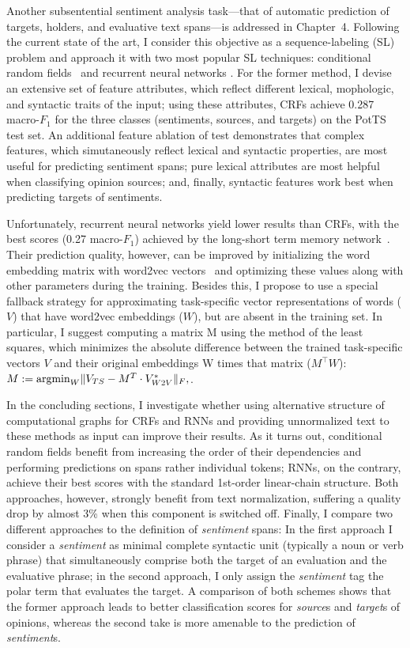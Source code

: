 \documentclass[11pt]{article}
\newcommand{\F}[0]{$F_1$}
\newcommand{\argmin}{\operatornamewithlimits{argmin}}
\renewcommand{\cite}{\citep}
\begin{document}
Another subsentential sentiment analysis task---that of automatic
prediction of targets, holders, and evaluative text spans---is
addressed in Chapter~4.  Following the current state of the art, I
consider this objective as a sequence-labeling (SL) problem and
approach it with two most popular SL techniques: conditional random
fields~\cite[CRFs; ][]{Lafferty:01} and recurrent neural networks
\cite[RNNs; ][]{Hochreiter:97,Cho:14a}.  For the former method, I
devise an extensive set of feature attributes, which reflect different
lexical, mophologic, and syntactic traits of the input; using these
attributes, CRFs achieve 0.287 macro-\F{} for the three classes
(sentiments, sources, and targets) on the PotTS test set.  An
additional feature ablation of test demonstrates that complex
features, which simutaneously reflect lexical and syntactic
properties, are most useful for predicting sentiment spans; pure
lexical attributes are most helpful when classifying opinion sources;
and, finally, syntactic features work best when predicting targets of
sentiments.

Unfortunately, recurrent neural networks yield lower results than
CRFs, with the best scores (0.27 macro-\F{}) achieved by the
long-short term memory network~\cite{Hochreiter:97}.  Their prediction
quality, however, can be improved by initializing the word embedding
matrix with word2vec vectors~\cite{Mikolov:13} and optimizing these
values along with other parameters during the training.  Besides this,
I propose to use a special fallback strategy for approximating
task-specific vector representations of words ($V$) that have word2vec
embeddings ($W$), but are absent in the training set.  In particular,
I suggest computing a matrix M using the method of the least squares,
which minimizes the absolute difference between the trained
task-specific vectors $V$ and their original embeddings W times that
matrix ($M^{\top}W$): $M := \argmin_{W}\lVert V_{TS} - M^T\cdot
V^*_{W2V}\rVert_F,$.

In the concluding sections, I investigate whether using alternative
structure of computational graphs for CRFs and RNNs and providing
unnormalized text to these methods as input can improve their results.
As it turns out, conditional random fields benefit from increasing the
order of their dependencies and performing predictions on spans rather
individual tokens; RNNs, on the contrary, achieve their best scores
with the standard 1st-order linear-chain structure.  Both approaches,
however, strongly benefit from text normalization, suffering a quality
drop by almost 3\% when this component is switched off.  Finally, I
compare two different approaches to the definition of \emph{sentiment}
spans: In the first approach I consider a \emph{sentiment} as minimal
complete syntactic unit (typically a noun or verb phrase) that
simultaneously comprise both the target of an evaluation and the
evaluative phrase; in the second approach, I only assign the
\emph{sentiment} tag the polar term that evaluates the target.  A
comparison of both schemes shows that the former approach leads to
better classification scores for \emph{source}s and \emph{target}s of
opinions, whereas the second take is more amenable to the prediction
of \emph{sentiment}s.
\end{document}
